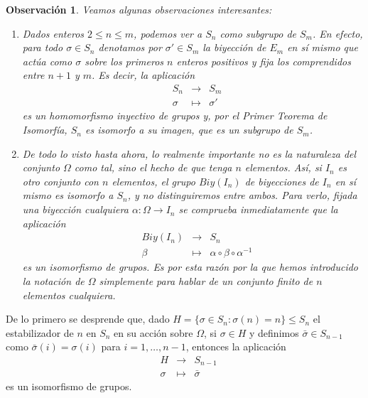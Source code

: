 \documentclass[12pt]{article}
\newtheorem{observation}{Observación}[theorem]
\begin{document}
\begin{observation}\label{eq:obsabel} Veamos algunas observaciones interesantes:
\begin{enumerate}
\item Dados enteros $2 \leq n \leq m$, podemos ver a $S_{n}$ como subgrupo de $S_{m}$. En efecto, para todo $\sigma \in S_{n}$ denotamos por $\sigma' \in S_{m}$ la biyección de $E_{m}$ en sí mismo que actúa como $\sigma$ sobre los primeros $n$ enteros positivos y fija los comprendidos entre $n+1$ y $m$. Es decir, la aplicación $$\begin{array}{rccl}
&S_{n}& \longrightarrow &S_{m}\\
&\sigma& \longmapsto &\sigma'
\end{array}
$$ es un homomorfismo inyectivo de grupos y, por el \textit{Primer Teorema de Isomorfía}, $S_{n}$ es isomorfo a su imagen, que es un subgrupo de $S_{m}$.
\item De todo lo visto hasta ahora, lo realmente importante no es la naturaleza del conjunto $\Omega$ como tal, sino el hecho de que tenga $n$ elementos. Así, si $I_{n}$ es otro conjunto con $n$ elementos, el grupo $Biy(I_{n})$ de biyecciones de $I_{n}$ en sí mismo es isomorfo a $S_{n}$, y no distinguiremos entre ambos. Para verlo, fijada una biyección cualquiera $\alpha \colon \Omega \longrightarrow I_{n}$ se comprueba inmediatamente que la aplicación  $$\begin{array}{rccl}
&Biy(I_{n})& \longrightarrow &S_{n}\\
&\beta& \longmapsto &\alpha\circ \beta \circ \alpha^{-1}
\end{array}
$$ es un isomorfismo de grupos. Es por esta razón por la que hemos introducido la notación de $\Omega$ simplemente para hablar de un conjunto finito de $n$ elementos cualquiera.
\end{enumerate}
\end{observation}

De lo primero se desprende que, dado $H = \lbrace \sigma \in S_{n} : \sigma(n) = n \rbrace \leq S_{n}$ el estabilizador de $n$ en $S_{n}$ en su acción sobre $\Omega$, si $\sigma \in H$ y definimos $\bar{\sigma} \in S_{n-1}$ como $\bar{\sigma}(i) = \sigma(i)$ para $i=1, \ldots, n-1$, entonces la aplicación $$\begin{array}{rccl}
&H& \longrightarrow &S_{n-1}\\
&\sigma& \longmapsto &\bar{\sigma}
\end{array}
$$ 
es un isomorfismo de grupos.
\end{document}
